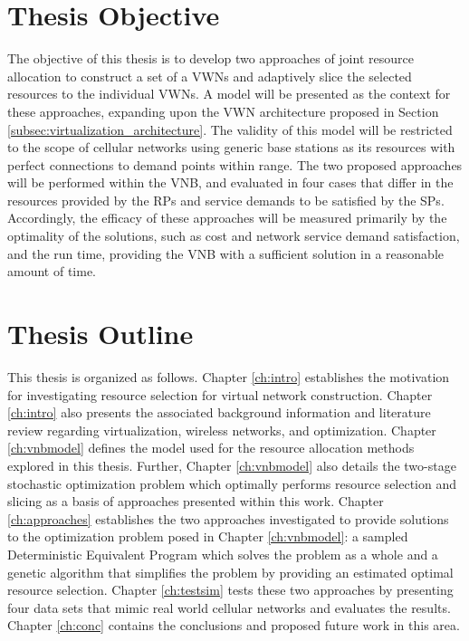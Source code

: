\documentclass[12pt,dvipsnames]{report}
\begin{document}
\section{Thesis Objective} \label{sec:objective}

The objective of this thesis is to develop two approaches of joint resource allocation to construct a set of a VWNs and adaptively slice the selected resources to the individual VWNs.  A model will be presented as the context for these approaches, expanding upon the VWN architecture proposed in Section \ref{subsec:virtualization_architecture}.  The validity of this model will be restricted to the scope of cellular networks using generic base stations as its resources with perfect connections to demand points within range.  The two proposed approaches will be performed within the VNB, and evaluated in four cases that differ in the resources provided by the RPs and service demands to be satisfied by the SPs.  Accordingly, the efficacy of these approaches will be measured primarily by the optimality of the solutions, such as cost and network service demand satisfaction, and the run time, providing the VNB with a sufficient solution in a reasonable amount of time.

\section{Thesis Outline} \label{sec:outline}

This thesis is organized as follows.  Chapter \ref{ch:intro} establishes the motivation for investigating resource selection for virtual network construction.  Chapter \ref{ch:intro} also presents the associated background information and literature review regarding virtualization, wireless networks, and optimization.  Chapter \ref{ch:vnbmodel} defines the model used for the resource allocation methods explored in this thesis.  Further, Chapter \ref{ch:vnbmodel} also details the two-stage stochastic optimization problem which optimally performs resource selection and slicing as a basis of approaches presented within this work. Chapter \ref{ch:approaches} establishes the two approaches investigated to provide solutions to the optimization problem posed in Chapter \ref{ch:vnbmodel}: a sampled Deterministic Equivalent Program which solves the problem as a whole and a genetic algorithm that simplifies the problem by providing an estimated optimal resource selection.  Chapter \ref{ch:testsim} tests these two approaches by presenting four data sets that mimic real world cellular networks and evaluates the results.  Chapter \ref{ch:conc} contains the conclusions and proposed future work in this area.
\fi
\end{document}
